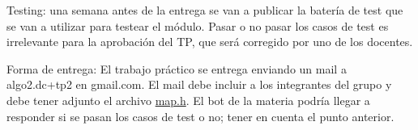 \begin{DoxyItemize}
\item Testing\+: una semana antes de la entrega se van a publicar la batería de test que se van a utilizar para testear el módulo. Pasar o no pasar los casos de test es irrelevante para la aprobación del TP, que será corregido por uno de los docentes.
\item Forma de entrega\+: El trabajo práctico se entrega enviando un mail a {\ttfamily algo2.\+dc+tp2} en {\ttfamily gmail.\+com}. El mail debe incluir a los integrantes del grupo y debe tener adjunto el archivo {\ttfamily \hyperlink{map_8h}{map.\+h}}. El bot de la materia podría llegar a responder si se pasan los casos de test o no; tener en cuenta el punto anterior. 
\end{DoxyItemize}